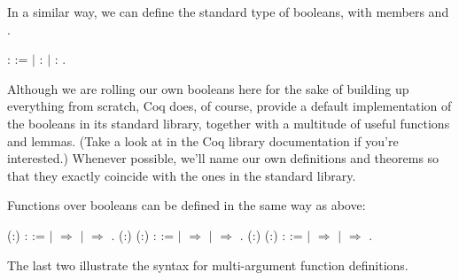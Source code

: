 \documentclass[12pt]{report}
\begin{document}
 In a similar way, we can define the standard type  of
    booleans, with members  and . \begin{coqdoccode}
\coqdocemptyline
\coqdocnoindent
{}  :  :=\coqdoceol
\coqdocindent{1.00em}
\ensuremath{|}  : \coqdoceol
\coqdocindent{1.00em}
\ensuremath{|}  : .\coqdoceol
\coqdocemptyline
\end{coqdoccode}
Although we are rolling our own booleans here for the sake
    of building up everything from scratch, Coq does, of course,
    provide a default implementation of the booleans in its standard
    library, together with a multitude of useful functions and
    lemmas.  (Take a look at  in the Coq library
    documentation if you're interested.)  Whenever possible, we'll
    name our own definitions and theorems so that they exactly
    coincide with the ones in the standard library. 

 Functions over booleans can be defined in the same way as
    above: \begin{coqdoccode}
\coqdocemptyline
\coqdocnoindent
{}  (:) :  := \coqdoceol
\coqdocindent{1.00em}
  \coqdoceol
\coqdocindent{1.00em}
\ensuremath{|}  \ensuremath{\Rightarrow} \coqdoceol
\coqdocindent{1.00em}
\ensuremath{|}  \ensuremath{\Rightarrow} \coqdoceol
\coqdocindent{1.00em}
.\coqdoceol
\coqdocemptyline
\coqdocnoindent
{}  (:) (:) :  := \coqdoceol
\coqdocindent{1.00em}
   \coqdoceol
\coqdocindent{1.00em}
\ensuremath{|}  \ensuremath{\Rightarrow}  \coqdoceol
\coqdocindent{1.00em}
\ensuremath{|}  \ensuremath{\Rightarrow} \coqdoceol
\coqdocindent{1.00em}
.\coqdoceol
\coqdocemptyline
\coqdocnoindent
{}  (:) (:) :  := \coqdoceol
\coqdocindent{1.00em}
   \coqdoceol
\coqdocindent{1.00em}
\ensuremath{|}  \ensuremath{\Rightarrow} \coqdoceol
\coqdocindent{1.00em}
\ensuremath{|}  \ensuremath{\Rightarrow} \coqdoceol
\coqdocindent{1.00em}
.\coqdoceol
\coqdocemptyline
\end{coqdoccode}
The last two illustrate the syntax for multi-argument
    function definitions. 
\end{document}
